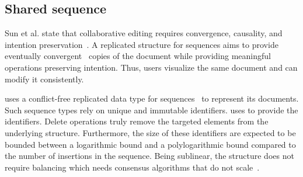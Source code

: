 



\subsection{Shared sequence}

Sun et al. state that collaborative editing requires convergence, causality, and
intention preservation~\cite{sun1998achieving}.
A replicated structure for sequences aims to provide eventually
convergent~\cite{shapiro2011conflict} copies of the document while providing
meaningful operations preserving intention. Thus, users visualize the same
document and can modify it consistently.

\CRATE uses a conflict-free replicated data type for
sequences~\cite{shapiro2011conflict} to represent its documents. Such sequence
types rely on unique and immutable identifiers. \CRATE uses \LSEQ to provide the
identifiers. Delete operations truly remove the targeted elements from the
underlying structure. Furthermore, the size of these identifiers are expected to
be bounded between a logarithmic bound and a polylogarithmic bound compared to
the number of insertions in the sequence.
Being sublinear, the structure does not require balancing which needs consensus
algorithms that do not scale~\cite{mostefaoui2015signature}.

